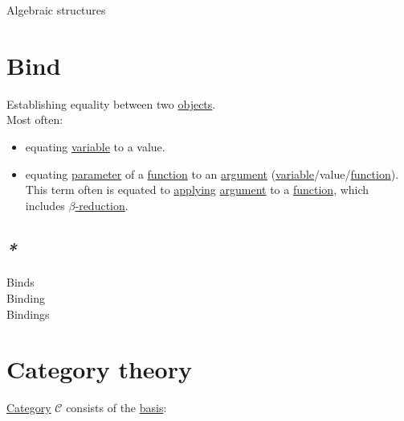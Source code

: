 \documentclass[a4paper,14pt,oneside]{book}
\begin{document}
\label{org8cd650d}Algebraic structures\\

\chapter{\label{orgd3cebc1}Bind}
\label{sec:org7a723cf}
Establishing equality between two \hyperref[orgd42a7f2]{objects}.\\

Most often:\\
\begin{itemize}
\item equating \hyperref[orgd43afbd]{variable} to a value.\\
\item equating \hyperref[org63b5bc7]{parameter} of a \hyperref[orge00b05b]{function} to an \hyperref[org9e788a4]{argument} (\hyperref[orgd43afbd]{variable}/value/\hyperref[orge00b05b]{function}). This term often is equated to \hyperref[org8ff03cd]{applying} \hyperref[org9e788a4]{argument} to a \hyperref[orge00b05b]{function}, which includes \hyperref[org65402d6]{\(\beta\)-reduction}.\\
\end{itemize}

\section{\emph{*}}
\label{sec:orgfbffd09}

\label{org78b8712}Binds\\
\label{org9a498ee}Binding\\
\label{orgcf59e83}Bindings\\

\chapter{\label{org64d8bd5}Category theory}
\label{sec:org97b735d}
\hyperref[orgc2c97e7]{Category} \(\mathcal{C}\) consists of the \hyperref[org5cf1e64]{basis}:\\
\end{document}
